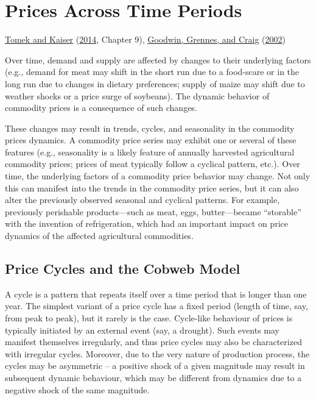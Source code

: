 \documentclass[
  oneside]{book}
\begin{document}
\hypertarget{prices-across-time-periods}{%
\chapter{Prices Across Time Periods}\label{prices-across-time-periods}}

\protect\hyperlink{ref-tomek2014}{Tomek and Kaiser} (\protect\hyperlink{ref-tomek2014}{2014}, Chapter 9), \protect\hyperlink{ref-goodwin2002}{Goodwin, Grennes, and Craig} (\protect\hyperlink{ref-goodwin2002}{2002})

Over time, demand and supply are affected by changes to their underlying factors (e.g., demand for meat may shift in the short run due to a food-scare or in the long run due to changes in dietary preferences; supply of maize may shift due to weather shocks or a price surge of soybeans). The dynamic behavior of commodity prices is a consequence of such changes.

These changes may result in trends, cycles, and seasonality in the commodity prices dynamics. A commodity price series may exhibit one or several of these features (e.g., seasonality is a likely feature of annually harvested agricultural commodity prices; prices of meat typically follow a cyclical pattern, etc.). Over time, the underlying factors of a commodity price behavior may change. Not only this can manifest into the trends in the commodity price series, but it can also alter the previously observed seasonal and cyclical patterns. For example, previously perishable products---such as meat, eggs, butter---became ``storable'' with the invention of refrigeration, which had an important impact on price dynamics of the affected agricultural commodities.

\hypertarget{price-cycles-and-the-cobweb-model}{%
\section{Price Cycles and the Cobweb Model}\label{price-cycles-and-the-cobweb-model}}

A cycle is a pattern that repeats itself over a time period that is longer than one year. The simplest variant of a price cycle has a fixed period (length of time, say, from peak to peak), but it rarely is the case. Cycle-like behaviour of prices is typically initiated by an external event (say, a drought). Such events may manifest themselves irregularly, and thus price cycles may also be characterized with irregular cycles. Moreover, due to the very nature of production process, the cycles may be asymmetric -- a positive shock of a given magnitude may result in subsequent dynamic behaviour, which may be different from dynamics due to a negative shock of the same magnitude.
\end{document}
